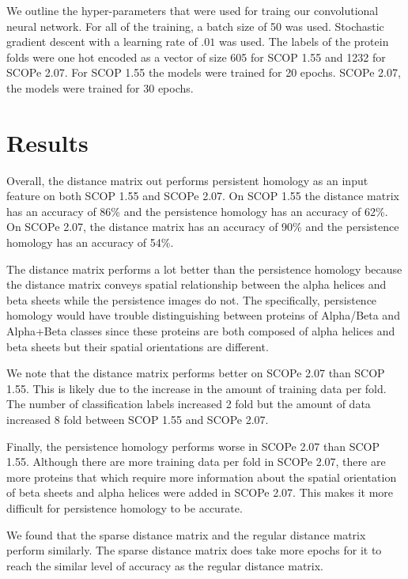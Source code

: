 \documentclass[12pt, a4paper, twocolumn, fullpage]{article}
\theoremstyle{plain}
\theoremstyle{definition}
\theoremstyle{remark}
\begin{document}
We outline the hyper-parameters that were used for traing our convolutional neural network. For all of the training, a batch size of 50 was used. Stochastic gradient descent with a learning rate of $.01$ was used. The labels of the protein folds were one hot encoded as a vector of size 605 for SCOP 1.55 and 1232 for SCOPe 2.07. For SCOP 1.55 the models were trained for 20 epochs. SCOPe 2.07, the models were trained for 30 epochs.


\section{Results}

Overall, the distance matrix out performs persistent homology as an input feature on both SCOP 1.55 and SCOPe 2.07. On SCOP 1.55 the distance matrix has an accuracy of 86\% and the persistence homology has an accuracy of 62\%. On SCOPe 2.07, the distance matrix has an accuracy of 90\% and the persistence homology has an accuracy of 54\%. 

The distance matrix performs a lot better than the persistence homology because the distance matrix conveys spatial relationship between the alpha helices and beta sheets while the persistence images do not. The specifically, persistence homology would have trouble distinguishing between proteins of Alpha/Beta and Alpha+Beta classes since these proteins are both composed of alpha helices and beta sheets but their spatial orientations are different. 

We note that the distance matrix performs better on SCOPe 2.07 than SCOP 1.55. This is likely due to the increase in the amount of training data per fold. The number of classification labels increased 2 fold but the amount of data increased 8 fold between SCOP 1.55 and SCOPe 2.07. 

Finally, the persistence homology performs worse in SCOPe 2.07 than SCOP 1.55. Although there are more training data per fold in SCOPe 2.07, there are more proteins that which require more information about the spatial orientation of beta sheets and alpha helices were added in SCOPe 2.07. This makes it more difficult for persistence homology to be accurate.

We found that the sparse distance matrix and the regular distance matrix perform similarly. The sparse distance matrix does take more epochs for it to reach the similar level of accuracy as the regular distance matrix.
\end{document}

